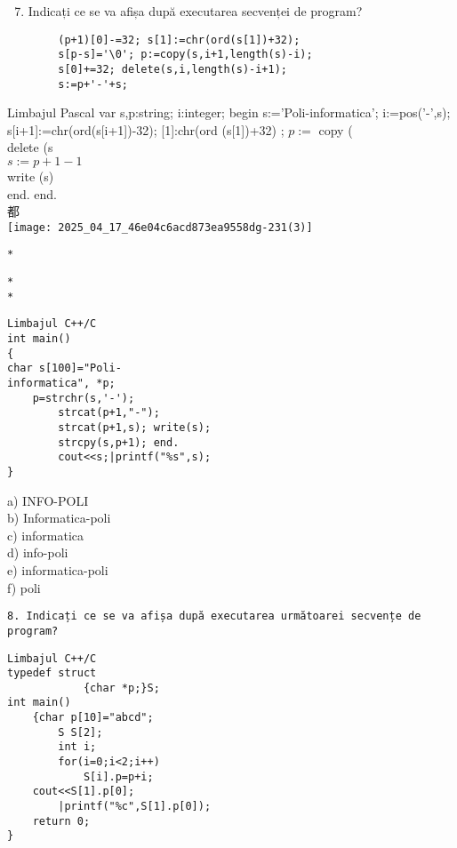 \begin{enumerate}
  \setcounter{enumi}{6}
  \item Indicați ce se va afișa după executarea secvenței de program?
\end{enumerate}

\begin{verbatim}
        (p+1)[0]-=32; s[1]:=chr(ord(s[1])+32);
        s[p-s]='\0'; p:=copy(s,i+1,length(s)-i);
        s[0]+=32; delete(s,i,length(s)-i+1);
        s:=p+'-'+s;
\end{verbatim}

Limbajul Pascal var s,p:string; i:integer; begin s:='Poli-informatica'; i:=pos('-',s); s[i+1]:=chr(ord(s[i+1])-32); [1]:chr(ord (s[1])+32) ; $p:=$ copy (\\
delete (s\\
$s:=p+1-1$\\
write (s)\\
end. end.\\
都\\
\texttt{[image: 2025\_04\_17\_46e04c6acd873ea9558dg-231(3)]}

\begin{verbatim}
*
\end{verbatim}

\begin{verbatim}
*
*
\end{verbatim}

\begin{verbatim}
Limbajul C++/C
int main()
{
char s[100]="Poli-
informatica", *p;
    p=strchr(s,'-');
        strcat(p+1,"-");
        strcat(p+1,s); write(s);
        strcpy(s,p+1); end.
        cout<<s;|printf("%s",s);
}
\end{verbatim}

a) INFO-POLI\\
b) Informatica-poli\\
c) informatica\\
d) info-poli\\
e) informatica-poli\\
f) poli

\begin{verbatim}
8. Indicați ce se va afișa după executarea următoarei secvențe de program?
\end{verbatim}

\begin{verbatim}
Limbajul C++/C
typedef struct
            {char *p;}S;
int main()
    {char p[10]="abcd";
        S S[2];
        int i;
        for(i=0;i<2;i++)
            S[i].p=p+i;
    cout<<S[1].p[0];
        |printf("%c",S[1].p[0]);
    return 0;
}
\end{verbatim}

